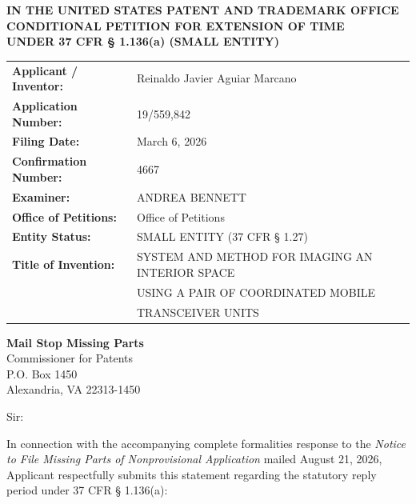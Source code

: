 \documentclass[11pt,letterpaper]{article}
\begin{document}
\thispagestyle{empty}

\begin{center}
    \textbf{\large IN THE UNITED STATES PATENT AND TRADEMARK OFFICE} \\
    \vspace{0.3cm}
    \textbf{\large CONDITIONAL PETITION FOR EXTENSION OF TIME} \\
    \textbf{\normalsize UNDER 37 CFR \S{} 1.136(a) (SMALL ENTITY)}
\end{center}

\vspace{0.4cm}
\noindent\begin{tabular}{p{2.3in}p{4.0in}}
\textbf{Applicant / Inventor:} & Reinaldo Javier Aguiar Marcano \\
\textbf{Application Number:} & 19/559,842 \\
\textbf{Filing Date:} & March 6, 2026 \\
\textbf{Confirmation Number:} & 4667 \\
\textbf{Examiner:} & ANDREA BENNETT \\
\textbf{Office of Petitions:} & Office of Petitions \\
\textbf{Entity Status:} & SMALL ENTITY (37 CFR \S{} 1.27) \\
\textbf{Title of Invention:} & SYSTEM AND METHOD FOR IMAGING AN INTERIOR SPACE \\
& USING A PAIR OF COORDINATED MOBILE \\
& TRANSCEIVER UNITS \\
\end{tabular}

\vspace{0.5cm}
\noindent\textbf{Mail Stop Missing Parts} \\
Commissioner for Patents \\
P.O. Box 1450 \\
Alexandria, VA 22313-1450

\vspace{0.2cm}
Sir:

In connection with the accompanying complete formalities response to the \textit{Notice to File Missing Parts of Nonprovisional Application} mailed August 21, 2026, Applicant respectfully submits this statement regarding the statutory reply period under 37 CFR \S{} 1.136(a):
\end{document}
